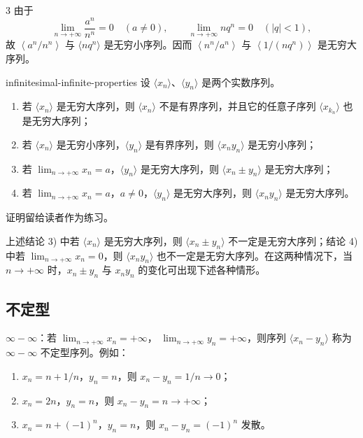 \begin{sourceexample}{3}
由于
\[
\lim_{n\to+\infty}\frac{a^n}{n^n}=0\quad(a\ne0),
\qquad
\lim_{n\to+\infty}nq^n=0\quad(|q|<1),
\]
故 \(\left\langle a^n/n^n\right\rangle\) 与 \(\langle nq^n\rangle\) 是无穷小序列。因而
\(\left\langle n^n/a^n\right\rangle\) 与
\(\left\langle1/(nq^n)\right\rangle\) 是无穷大序列。
\end{sourceexample}

\begin{mythm}{}{infinitesimal-infinite-properties}
设 \(\langle x_n\rangle\)、\(\langle y_n\rangle\) 是两个实数序列。
\begin{enumerate}[label=\arabic*)]
  \item 若 \(\langle x_n\rangle\) 是无穷大序列，则 \(\langle x_n\rangle\) 不是有界序列，并且它的任意子序列 \(\langle x_{k_n}\rangle\) 也是无穷大序列；
  \item 若 \(\langle x_n\rangle\) 是无穷小序列，\(\langle y_n\rangle\) 是有界序列，则 \(\langle x_ny_n\rangle\) 是无穷小序列；
  \item 若 \(\lim_{n\to+\infty}x_n=a\)，\(\langle y_n\rangle\) 是无穷大序列，则 \(\langle x_n\pm y_n\rangle\) 是无穷大序列；
  \item 若 \(\lim_{n\to+\infty}x_n=a\)，\(a\ne0\)，\(\langle y_n\rangle\) 是无穷大序列，则 \(\langle x_ny_n\rangle\) 是无穷大序列。
\end{enumerate}
\end{mythm}

证明留给读者作为练习。

上述结论 3) 中若 \(\langle x_n\rangle\) 是无穷大序列，则 \(\langle x_n\pm y_n\rangle\) 不一定是无穷大序列；结论 4) 中若 \(\lim_{n\to+\infty}x_n=0\)，则 \(\langle x_ny_n\rangle\) 也不一定是无穷大序列。在这两种情况下，当 \(n\to+\infty\) 时，\(x_n\pm y_n\) 与 \(x_ny_n\) 的变化可出现下述各种情形。

\subsection{不定型}

\textbf{\(\infty-\infty\)}：若
\(\lim_{n\to+\infty}x_n=+\infty\)，
\(\lim_{n\to+\infty}y_n=+\infty\)，则序列
\(\langle x_n-y_n\rangle\) 称为 \(\infty-\infty\) 不定型序列。例如：
\begin{enumerate}[label=\roman*)]
  \item \(x_n=n+1/n\)，\(y_n=n\)，则 \(x_n-y_n=1/n\to0\)；
  \item \(x_n=2n\)，\(y_n=n\)，则 \(x_n-y_n=n\to+\infty\)；
  \item \(x_n=n+(-1)^n\)，\(y_n=n\)，则 \(x_n-y_n=(-1)^n\) 发散。
\end{enumerate}

